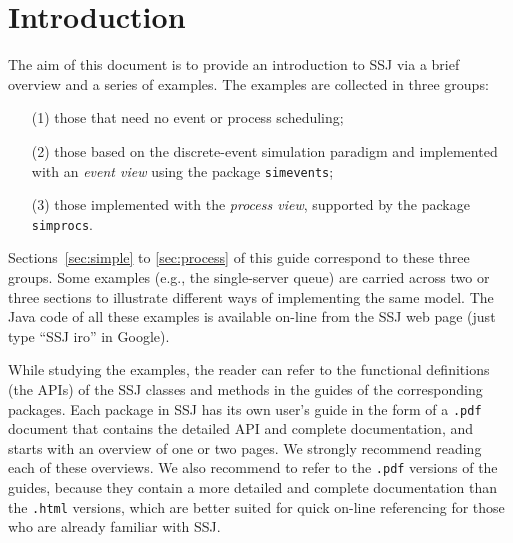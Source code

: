\section{Introduction}

The aim of this document is to provide an introduction to SSJ
via a brief overview and a series of examples.
The examples are collected in three groups:
\begin{itemize}
\itemsep=0pt
\item[(1)] 
 those that need no event or process scheduling;
\item[(2)] 
 those based on the discrete-event simulation paradigm 
 and implemented with an \emph{event view} using the package 
 \texttt{simevents};
\item[(3)] 
 those implemented with the \emph{process view}, 
 supported by the package \texttt{simprocs}.
\end{itemize}
Sections~\ref{sec:simple} to \ref{sec:process} 
of this guide correspond to these three groups.
Some examples (e.g., the single-server queue) are carried across
two or three sections to illustrate different ways of implementing
the same model.
The Java code of all these examples is available on-line from the 
SSJ web page (just type ``SSJ iro'' in Google).

While studying the examples, the reader can refer to the functional 
definitions (the APIs) of the SSJ classes and methods in the guides of the 
corresponding packages.
Each package in SSJ has its own user's guide in the form of a \texttt{.pdf}
document that contains the detailed API and complete documentation,
and starts with an overview of one or two pages.
We strongly recommend reading each of these overviews.
We also recommend to refer to the \texttt{.pdf} versions of the guides,
because they contain a more detailed and complete documentation
than the \texttt{.html} versions, which are better suited for quick
on-line referencing for those who are already familiar with SSJ.


